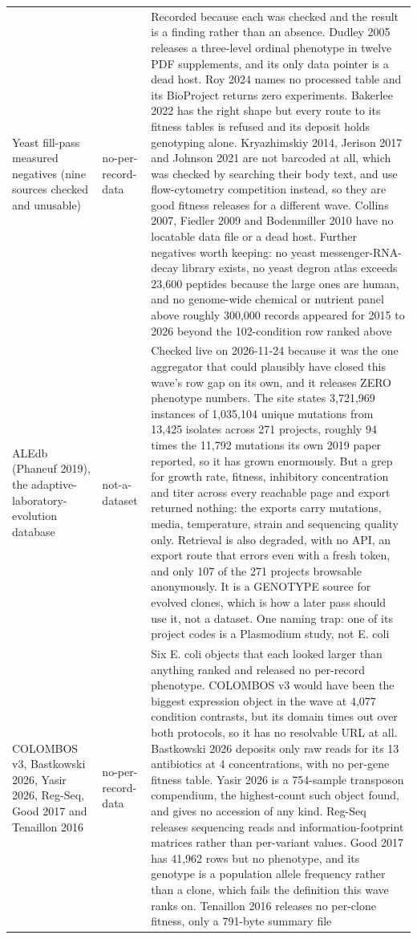 \begin{longtable}{@{}L{58mm} L{26mm} L{88mm}@{}}
\addlinespace[5pt]
Yeast fill-pass measured negatives (nine sources checked and unusable) & no-per-record-data & Recorded because each was checked and the result is a finding rather than an absence. Dudley 2005 releases a three-level ordinal phenotype in twelve PDF supplements, and its only data pointer is a dead host. Roy 2024 names no processed table and its BioProject returns zero experiments. Bakerlee 2022 has the right shape but every route to its fitness tables is refused and its deposit holds genotyping alone. Kryazhimskiy 2014, Jerison 2017 and Johnson 2021 are not barcoded at all, which was checked by searching their body text, and use flow-cytometry competition instead, so they are good fitness releases for a different wave. Collins 2007, Fiedler 2009 and Bodenmiller 2010 have no locatable data file or a dead host. Further negatives worth keeping: no yeast messenger-RNA-decay library exists, no yeast degron atlas exceeds 23,600 peptides because the large ones are human, and no genome-wide chemical or nutrient panel above roughly 300,000 records appeared for 2015 to 2026 beyond the 102-condition row ranked above \\
\addlinespace[5pt]
ALEdb (Phaneuf 2019), the adaptive-laboratory-evolution database & not-a-dataset & Checked live on 2026-11-24 because it was the one aggregator that could plausibly have closed this wave's row gap on its own, and it releases ZERO phenotype numbers. The site states 3,721,969 instances of 1,035,104 unique mutations from 13,425 isolates across 271 projects, roughly 94 times the 11,792 mutations its own 2019 paper reported, so it has grown enormously. But a grep for growth rate, fitness, inhibitory concentration and titer across every reachable page and export returned nothing: the exports carry mutations, media, temperature, strain and sequencing quality only. Retrieval is also degraded, with no API, an export route that errors even with a fresh token, and only 107 of the 271 projects browsable anonymously. It is a GENOTYPE source for evolved clones, which is how a later pass should use it, not a dataset. One naming trap: one of its project codes is a Plasmodium study, not E. coli \\
\addlinespace[5pt]
COLOMBOS v3, Bastkowski 2026, Yasir 2026, Reg-Seq, Good 2017 and Tenaillon 2016 & no-per-record-data & Six E. coli objects that each looked larger than anything ranked and released no per-record phenotype. COLOMBOS v3 would have been the biggest expression object in the wave at 4,077 condition contrasts, but its domain times out over both protocols, so it has no resolvable URL at all. Bastkowski 2026 deposits only raw reads for its 13 antibiotics at 4 concentrations, with no per-gene fitness table. Yasir 2026 is a 754-sample transposon compendium, the highest-count such object found, and gives no accession of any kind. Reg-Seq releases sequencing reads and information-footprint matrices rather than per-variant values. Good 2017 has 41,962 rows but no phenotype, and its genotype is a population allele frequency rather than a clone, which fails the definition this wave ranks on. Tenaillon 2016 releases no per-clone fitness, only a 791-byte summary file \\

\end{longtable}
